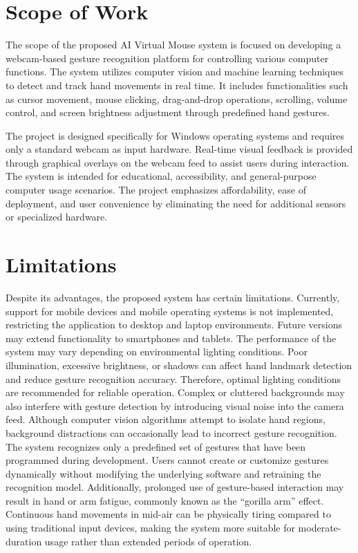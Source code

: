 \documentclass[12pt,a4paper]{report}
\begin{document}
\begin{enumerate}
\section{Scope of Work}



The scope of the proposed AI Virtual Mouse system is focused on developing a webcam-based gesture recognition platform for controlling various computer functions. The system utilizes computer vision and machine learning techniques to detect and track hand movements in real time. It includes functionalities such as cursor movement, mouse clicking, drag-and-drop operations, scrolling, volume control, and screen brightness adjustment through predefined hand gestures.

The project is designed specifically for Windows operating systems and requires only a standard webcam as input hardware. Real-time visual feedback is provided through graphical overlays on the webcam feed to assist users during interaction. The system is intended for educational, accessibility, and general-purpose computer usage scenarios. The project emphasizes affordability, ease of deployment, and user convenience by eliminating the need for additional sensors or specialized hardware.

\section{Limitations}

Despite its advantages, the proposed system has certain limitations. Currently, support for mobile devices and mobile operating systems is not implemented, restricting the application to desktop and laptop environments. Future versions may extend functionality to smartphones and tablets.
\newline
The performance of the system may vary depending on environmental lighting conditions. Poor illumination, excessive brightness, or shadows can affect hand landmark detection and reduce gesture recognition accuracy. Therefore, optimal lighting conditions are recommended for reliable operation.
\newline
Complex or cluttered backgrounds may also interfere with gesture detection by introducing visual noise into the camera feed. Although computer vision algorithms attempt to isolate hand regions, background distractions can occasionally lead to incorrect gesture recognition.
\newline
The system recognizes only a predefined set of gestures that have been programmed during development. Users cannot create or customize gestures dynamically without modifying the underlying software and retraining the recognition model.
\newline
Additionally, prolonged use of gesture-based interaction may result in hand or arm fatigue, commonly known as the ``gorilla arm'' effect. Continuous hand movements in mid-air can be physically tiring compared to using traditional input devices, making the system more suitable for moderate-duration usage rather than extended periods of operation.


\end{enumerate}
\end{document}
